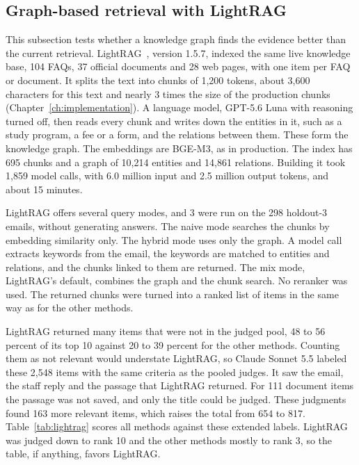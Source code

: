 \subsection{Graph-based retrieval with LightRAG}
\label{sec:live-lightrag}

This subsection tests whether a knowledge graph finds the evidence better than the current retrieval. LightRAG~\cite{guo2024lightrag}, version 1.5.7, indexed the same live knowledge base, 104 FAQs, 37 official documents and 28 web pages, with one item per FAQ or document. It splits the text into chunks of 1,200 tokens, about 3,600 characters for this text and nearly 3 times the size of the production chunks (Chapter~\ref{ch:implementation}). A language model, GPT-5.6 Luna with reasoning turned off, then reads every chunk and writes down the entities in it, such as a study program, a fee or a form, and the relations between them. These form the knowledge graph. The embeddings are BGE-M3, as in production. The index has 695 chunks and a graph of 10,214 entities and 14,861 relations. Building it took 1,859 model calls, with 6.0 million input and 2.5 million output tokens, and about 15 minutes.

LightRAG offers several query modes, and 3 were run on the 298 holdout-3 emails, without generating answers. The naive mode searches the chunks by embedding similarity only. The hybrid mode uses only the graph. A model call extracts keywords from the email, the keywords are matched to entities and relations, and the chunks linked to them are returned. The mix mode, LightRAG's default, combines the graph and the chunk search. No reranker was used. The returned chunks were turned into a ranked list of items in the same way as for the other methods.

LightRAG returned many items that were not in the judged pool, 48 to 56 percent of its top 10 against 20 to 39 percent for the other methods. Counting them as not relevant would understate LightRAG, so Claude Sonnet 5.5 labeled these 2,548 items with the same criteria as the pooled judges. It saw the email, the staff reply and the passage that LightRAG returned. For 111 document items the passage was not saved, and only the title could be judged. These judgments found 163 more relevant items, which raises the total from 654 to 817. Table~\ref{tab:lightrag} scores all methods against these extended labels. LightRAG was judged down to rank 10 and the other methods mostly to rank 3, so the table, if anything, favors LightRAG.

